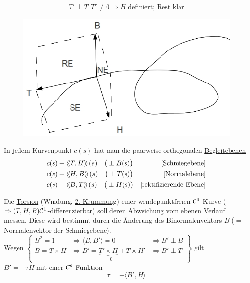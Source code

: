 \begin{beweis}
 \begin{align*}
  T'\perp T, T' \ne 0 \Rightarrow H \text{ definiert; Rest klar}
 \end{align*}

\end{beweis}

\begin{folgerung}
\begin{figure}[ht]
 \centering
 \includegraphics[scale=0.3]{Bilder/Bsp2.jpg}
\end{figure}

 In jedem Kurvenpunkt \(c(s)\) hat man die paarweise orthogonalen \uline{Begleitebenen}
 \begin{align*}
  &c(s) + \left\langle\!\left\langle T,H \right\rangle\!\right\rangle(s) \quad \big(\perp B(s)\big) & \text{[Schmiegebene]} \\
  &c(s) + \left\langle\!\left\langle H,B \right\rangle\!\right\rangle(s) \quad \big(\perp T(s)\big) & \text{[Normalebene]} \\
  &c(s) + \left\langle\!\left\langle B,T \right\rangle\!\right\rangle(s) \quad \big(\perp H(s)\big) & \text{[rektifizierende Ebene]} 
 \end{align*}
\end{folgerung}

Die \uline{Torsion} (Windung, \uline{2. Krümmung}) einer wendepunktfreien \(\mathcal{C}^3\)-Kurve (\(\Rightarrow (T,H,B) \mathcal{C}^1\)-differen\-zier\-bar) soll deren Abweichung vom ebenen Verlauf messen. Diese wird bestimmt durch die Änder\-ung des Binormalenvektors \(B\) (\(=\) Normalenvektor der Schmiegebene). \\
Wegen \(\begin{Bmatrix}
         B^2 = 1 & \Rightarrow \langle B,B'\rangle = 0  &\Rightarrow B' \perp B \\
         B = T \times H & \Rightarrow B' = \underbrace{T' \times H}_{= 0} + T \times H' &\Rightarrow B' \perp T
        \end{Bmatrix}\) gilt \\
        \(B' = -\tau H\) mit einer \(\mathcal{C}^0\)-Funktion
        \[
         \tau = -\langle B', H\rangle
        \]
        
